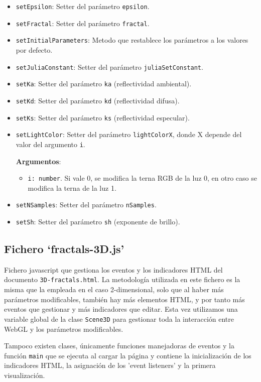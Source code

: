 \begin{itemize}
    \item \verb|setEpsilon|: Setter del parámetro \verb|epsilon|.
    \item \verb|setFractal|: Setter del parámetro \verb|fractal|.
    \item \verb|setInitialParameters|: Metodo que restablece los parámetros a los valores por defecto.
    \item \verb|setJuliaConstant|: Setter del parámetro \verb|juliaSetConstant|.
    \item \verb|setKa|: Setter del parámetro \verb|ka| (reflectividad ambiental).
    \item \verb|setKd|: Setter del parámetro \verb|kd| (reflectividad difusa).
    \item \verb|setKs|: Setter del parámetro \verb|ks| (reflectividad especular).
    \item \verb|setLightColor|: Setter del parámetro \verb|lightColorX|, donde X depende del valor del argumento \verb|i|.
    
    \textbf{Argumentos}:
    \begin{itemize}
        \item \verb|i: number|. Si vale 0, se modifica la terna RGB de la luz 0, en otro caso se modifica la terna de la luz 1.
    \end{itemize}
    \item \verb|setNSamples|: Setter del parámetro \verb|nSamples|.
    
    \item \verb|setSh|: Setter del parámetro \verb|sh| (exponente de brillo).
\end{itemize}

\subsection{Fichero `fractals-3D.js'}

Fichero javascript que gestiona los eventos y los indicadores HTML del documento \verb|3D-fractals.html|. La metodología utilizada en este fichero es la misma que la empleada en el caso 2-dimensional, solo que al haber más parámetros modificables, también hay más elementos HTML, y por tanto más eventos que gestionar y más indicadores que editar. Esta vez utilizamos una variable global de la clase \verb|Scene3D| para gestionar toda la interacción entre WebGL y los parámetros modificables.

Tampoco existen clases, únicamente funciones manejadoras de eventos y la función \verb|main| que se ejecuta al cargar la página y contiene la inicialización de los indicadores HTML, la asignación de los 'event listeners' y la primera visualización.

